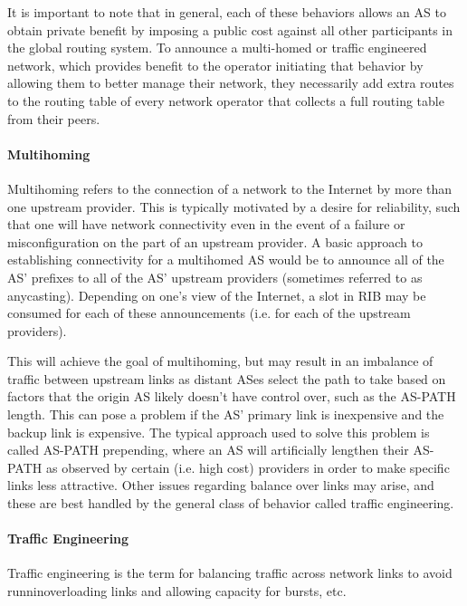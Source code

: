 It is important to note that in general, each of these behaviors allows an AS to obtain private benefit by imposing a public cost against all other participants in the global routing system. To announce a multi-homed or traffic engineered network, which provides benefit to the operator initiating that behavior by allowing them to better manage their network, they necessarily add extra routes to the routing table of every network operator that collects a full routing table from their peers.

\paragraph{Multihoming}

Multihoming refers to the connection of a network to the Internet by more than one upstream provider. This is typically motivated by a desire for reliability, such that one will have network connectivity even in the event of a failure or misconfiguration on the part of an upstream provider. A basic approach to establishing connectivity for a multihomed AS would be to announce all of the AS' prefixes to all of the AS' upstream providers (sometimes referred to as anycasting). Depending on one's view of the Internet, a slot in RIB may be consumed for each of these announcements (i.e. for each of the upstream providers).

This will achieve the goal of multihoming, but may result in an imbalance of traffic between upstream links as distant ASes select the path to take based on factors that the origin AS likely doesn't have control over, such as the AS-PATH length. This can pose a problem if the AS' primary link is inexpensive and the backup link is expensive. The typical approach used to solve this problem is called AS-PATH prepending, where an AS will artificially lengthen their AS-PATH as observed by certain (i.e. high cost) providers in order to make specific links less attractive. Other issues regarding balance over links may arise, and these are best handled by the general class of behavior called traffic engineering.

\paragraph{Traffic Engineering}

Traffic engineering is the term for balancing traffic across network links to avoid runninoverloading links and allowing capacity for bursts, etc.

